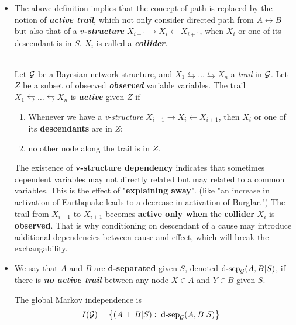 \documentclass[11pt]{article}
\begin{document}
\begin{itemize}
\item The above definition implies that the concept of path is replaced by the notion of \emph{\textbf{active trail}}, which not only consider directed path from $A \leftrightarrow B$ but also that of a \emph{\textbf{$v$-structure}} $X_{i-1} \rightarrow X_{i} \leftarrow X_{i+1}$, when $X_i$ or one of its descendant is in $S$. $X_i$ is called a \emph{\textbf{collider}}.

\begin{definition} \citep{koller2009probabilistic}\\
Let ${\mathcal G}$ be a Bayesian network structure, and $X_1 \leftrightarrows \ldots \leftrightarrows  X_n$ a \emph{trail} in ${\mathcal G}$. Let $Z$ be a subset of observed
\emph{\textbf{observed}} variable variables. The trail $X_1 \leftrightarrows \ldots \leftrightarrows  X_n$ is \emph{\textbf{active}} given $Z$ if
\begin{enumerate}
\item Whenever we have a \emph{v-structure} $X_{i-1} \rightarrow X_i \leftarrow X_{i+1}$, then $X_i$ or one of its \textbf{descendants} are in $Z$;
\item no other node along the trail is in $Z$.
\end{enumerate}
\end{definition}

The existence of \textbf{v-structure dependency} indicates that sometimes dependent variables may not directly related but may related to a common variables. This is the effect of "\textbf{explaining away}". (like "an increase in activation of Earthquake leads to a decrease in activation of Burglar.")  The trail from $X_{i-1}$ to $X_{i+1}$  becomes \textbf{active only when} the \textbf{collider} $X_i$ is \textbf{observed}. That is why conditioning on descendant of a cause may introduce additional dependencies between cause and effect, which will break the exchangability. 

\item
\begin{definition}
We say that $A$ and $B$ are \textbf{\textbf{d-separated}} given $S$, denoted $\text{d-sep}_{{\mathcal G}}(A,  B | S)$, if there is \emph{\textbf{no active trail}} between any node $X \in A$ and $Y \in  B$ given $S$.

The global Markov independence is 
\begin{align*}
I(\cG) &= \set{ (A \indep B | S):\;  \text{d-sep}_{\cG}(A,  B | S)}
\end{align*}
\end{definition}


\end{itemize}
\end{document}
